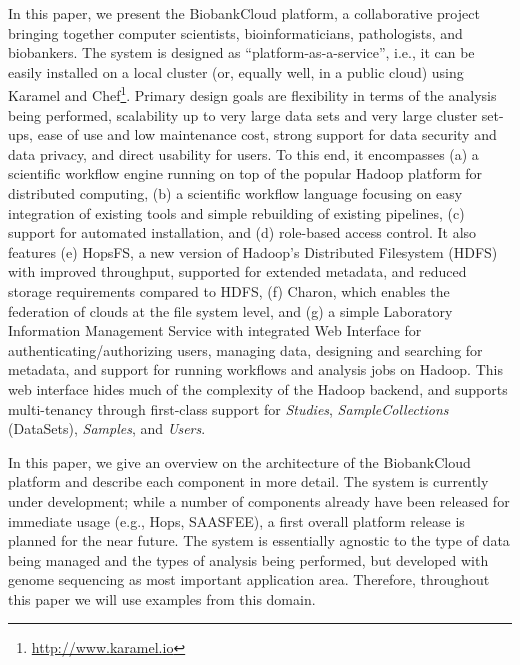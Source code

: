 In this paper, we present the BiobankCloud platform, a collaborative project bringing together computer scientists, bioinformaticians, pathologists, and biobankers. The system is designed as ``platform-as-a-service'', i.e., it can be easily installed on a local cluster (or, equally well, in a public cloud) using Karamel and Chef\footnote{\url{http://www.karamel.io}}. Primary design goals are flexibility in terms of the analysis being performed, scalability up to very large data sets and very large cluster set-ups, ease of use and low maintenance cost, strong support for data security and data privacy, and direct usability for users. To this end, it encompasses (a) a scientific workflow engine running on top of the popular Hadoop platform for distributed computing, (b) a scientific workflow language focusing on easy integration of existing tools and simple rebuilding of existing pipelines, (c) support for automated installation, and (d) role-based access control. It also features (e) HopsFS, a new version of Hadoop's Distributed Filesystem (HDFS) with improved throughput, supported for extended metadata, and reduced storage requirements compared to HDFS, (f) Charon, which enables the federation of clouds at the file system level, and (g) a simple Laboratory Information Management Service with integrated Web Interface for authenticating/authorizing users, managing data, designing and searching for metadata, and support for running workflows and analysis jobs on Hadoop. This web interface hides much of the complexity of the Hadoop backend, and supports multi-tenancy through first-class support for \textit{Studies}, \textit{SampleCollections} (DataSets), \textit{Samples}, and \textit{Users}. 

In this paper, we give an overview on the architecture of the BiobankCloud platform and describe each component in more detail. The system is currently under development; while a number of components already have been released for immediate usage (e.g., Hops, SAASFEE), a first overall platform release is planned for the near future. The system is essentially agnostic to the type of data being managed and the types of analysis being performed, but developed with genome sequencing as most important application area. Therefore, throughout this paper we will use examples from this domain. 